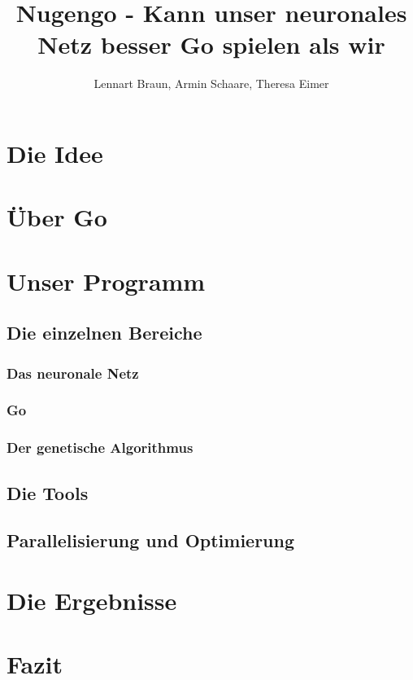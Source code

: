 \documentclass[12pt,a4paper]{article}
\author{Lennart Braun, Armin Schaare, Theresa Eimer}
\title{Nugengo - Kann unser neuronales Netz besser Go spielen als wir}
\begin{document}
\maketitle
\tableofcontents

\section{Die Idee}

\section{Über Go}

\section{Unser Programm}

\subsection{Die einzelnen Bereiche}

\subsubsection{Das neuronale Netz}
\subsubsection{Go}
\subsubsection{Der genetische Algorithmus}

\subsection{Die Tools}

\subsection{Parallelisierung und Optimierung}

\section{Die Ergebnisse}

\section{Fazit}
\end{document}
